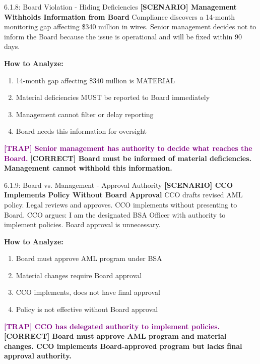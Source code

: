 \documentclass[11pt,a4paper]{beamer}
\newcommand{\trap}[1]{\textcolor{purple}{\textbf{[TRAP] #1}}}
\newcommand{\correct}[1]{\textcolor{green!50!black}{\textbf{[CORRECT] #1}}}
\newcommand{\scenario}[1]{\textcolor{blue!70!black}{\textbf{[SCENARIO] #1}}}
\begin{document}
\begin{frame}{6.1.8: Board Violation - Hiding Deficiencies}
	\scenario{Management Withholds Information from Board}
	Compliance discovers a 14-month monitoring gap affecting \$340 million in wires. Senior management decides not to inform the Board because the issue is operational and will be fixed within 90 days.
	
	\vspace{0.1cm}
	\textbf{How to Analyze:}
	\begin{enumerate}
		\item 14-month gap affecting \$340 million is MATERIAL
		\item Material deficiencies MUST be reported to Board immediately
		\item Management cannot filter or delay reporting
		\item Board needs this information for oversight
	\end{enumerate}
	\trap{Senior management has authority to decide what reaches the Board.}
	\correct{Board must be informed of material deficiencies. Management cannot withhold this information.}
\end{frame}

\begin{frame}{6.1.9: Board vs. Management - Approval Authority}
	\scenario{CCO Implements Policy Without Board Approval}
	CCO drafts revised AML policy. Legal reviews and approves. CCO implements without presenting to Board. CCO argues: I am the designated BSA Officer with authority to implement policies. Board approval is unnecessary.
	
	\vspace{0.1cm}
	\textbf{How to Analyze:}
	\begin{enumerate}
		\item Board must approve AML program under BSA
		\item Material changes require Board approval
		\item CCO implements, does not have final approval
		\item Policy is not effective without Board approval
	\end{enumerate}
	\trap{CCO has delegated authority to implement policies.}
	\correct{Board must approve AML program and material changes. CCO implements Board-approved program but lacks final approval authority.}
\end{frame}
\end{document}

